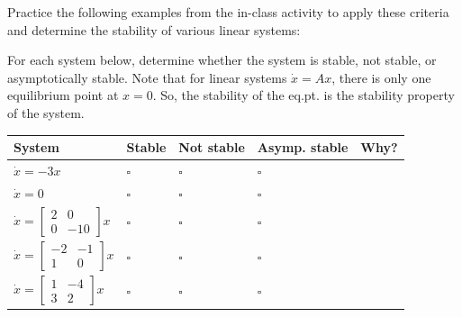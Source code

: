 \documentclass{ee122_notes}
\begin{document}
Practice the following examples from the in-class activity to apply these criteria and determine the stability of various linear systems:
\begin{popquiz}
For each system below, determine whether the system is stable, not stable, or asymptotically stable. Note that for linear systems $\dot{x} = Ax$, there is only one equilibrium point at $x=0$. So, the stability of the eq.pt. is the stability property of the system.
\begin{center}
    \small 
\begin{tabular}{|>{\centering\arraybackslash}m{}|
                    >{\centering\arraybackslash}m{}|
                    >{\centering\arraybackslash}m{}|
                    >{\centering\arraybackslash}m{}|
                    m{}|}
\hline
\textbf{System} & \textbf{Stable} & \textbf{Not stable} & \textbf{Asymp. stable} & \textbf{Why?} \\
\hline

$\dot{x} = -3x$ 
& $\square$ & $\square$ & $\square$ & \\[1.2cm]
\hline

$\dot{x} = 0$
& $\square$ & $\square$ & $\square$ & \\[1.2cm]
\hline

$\dot{x} =
\begin{bmatrix}
2 & 0\\
0 & -10
\end{bmatrix}x$
& $\square$ & $\square$ & $\square$ & \\[1.5cm]
\hline

$\dot{x} =
\begin{bmatrix}
-2 & -1\\
1 & 0
\end{bmatrix}x$
& $\square$ & $\square$ & $\square$ & \\[1.5cm]
\hline

$\dot{x} =
\begin{bmatrix}
1 & -4\\
3 & 2
\end{bmatrix}x$
& $\square$ & $\square$ & $\square$ & \\[1.5cm]
\hline


\end{tabular}
\end{center}
\end{popquiz}
\end{document}

